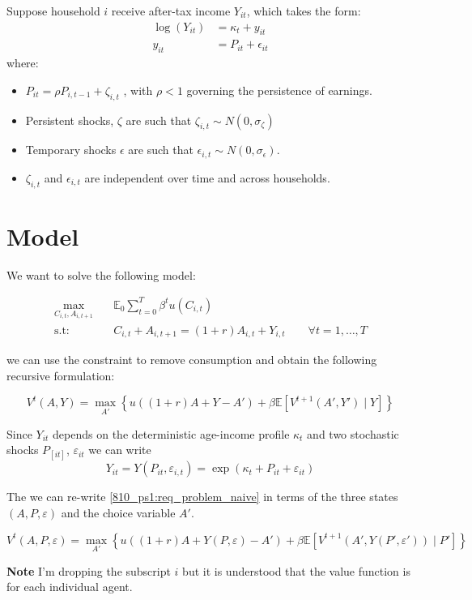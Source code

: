 \documentclass[12pt]{article}
\begin{document}
Suppose household $i$ receive after-tax income $Y_{i t}$, which takes the form:
\begin{align*}
    \log \left(Y_{i t}\right) &=\kappa_{t}+y_{i t} \\
    y_{i t} &=P_{i t}+\epsilon_{i t}
\end{align*}
where:
\begin{itemize}
    \item $P_{i t}=\rho P_{i, t-1}+\zeta_{i, t}$ , with $\rho<1$ governing the persistence of earnings. 
    \item Persistent shocks, $\zeta$ are such that $\zeta_{i, t} \sim N\left(0, \sigma_{\zeta}\right)$
    \item Temporary shocks $\epsilon$ are such that  $\epsilon_{i, t} \sim N\left(0, \sigma_{\epsilon}\right)$. 
    \item $\zeta_{i, t}$ and $\epsilon_{i, t}$ are independent over time and across households.
\end{itemize}


\section{Model}
We want to solve the following model:

\begin{align*}\label{810_ps1:seq_problem}
\max_{C_{i,t}, A_{i,t+1}} \quad &\mathbb{E}_0 \sum_{t = 0}^{T}\beta^{t}u(C_{i,t})\\
\text{s.t:} \quad & C_{i,t} + A_{i,t+1} = (1+r)A_{i,t}+Y_{i,t} \qquad \forall t=1,\ldots,T
\end{align*}

we can use the constraint to remove consumption and obtain the following recursive formulation:

\begin{equation}\label{810_ps1:req_problem_naive}
    V^t(A, Y) = \max_{A'}\left\{u\left( (1+r)A+Y - A'\right) + \beta \mathbb{E}\left[ V^{t+1}(A', Y') \mid Y \right] \right\}
\end{equation}

Since $Y_{it}$ depends on the deterministic age-income profile $\kappa_t$ and two stochastic shocks $P_[it]$, $\varepsilon_{it}$ we can write $$Y_{it} = Y(P_{it}, \varepsilon_{i,t}) = \exp{(\kappa_t + P_{it} + \varepsilon_{it})}$$

The we can re-write \eqref{810_ps1:req_problem_naive} in terms of the three states $(A, P, \varepsilon)$ and the choice variable $A'$.

\begin{equation}\label{810_ps1:req_problem}
     V^t(A, P, \varepsilon) = \max_{A'}\left\{u\left( (1+r)A+ Y(P, \varepsilon) - A'\right) + \beta \mathbb{E}\left[ V^{t+1}(A', Y(P', \varepsilon')) \mid P' \right] \right\}
\end{equation}

\textbf{Note} I'm dropping the subscript $i$ but it is understood that the value function is for each individual agent.





\end{document}
